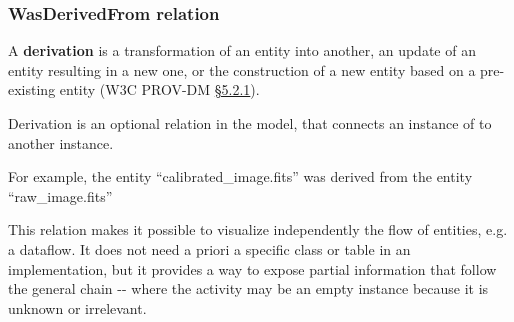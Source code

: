 \subsubsection{WasDerivedFrom relation}

A \textbf{derivation} is a transformation of an entity into another, an update of an entity resulting in a new one, or the construction of a new entity based on a pre-existing entity (W3C PROV-DM \href{https://www.w3.org/TR/prov-dm/#term-Derivation}{\S5.2.1}).

Derivation is an optional relation  in the model, that connects an instance of  to another instance.

For example, the entity ``calibrated\_image.fits'' was derived from the entity ``raw\_image.fits''

This relation makes it possible to visualize independently the flow of entities, e.g. a dataflow. It does not need a priori a specific class or table in an implementation, but it provides a way to expose partial information that follow the general chain -- where the activity may be an empty instance because it is unknown or irrelevant.




